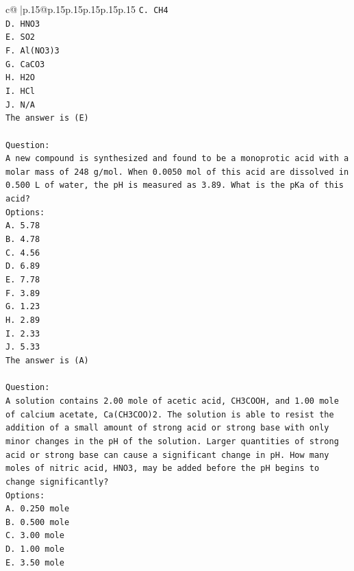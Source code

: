 \documentclass{article}
\begin{document}
{\begin{supertabular}{c@{$\;$}|p{.15\linewidth}@{}p{.15\linewidth}p{.15\linewidth}p{.15\linewidth}p{.15\linewidth}p{.15\linewidth}}
{{{\texttt{C. CH4} \\
\texttt{D. HNO3} \\
\texttt{E. SO2} \\
\texttt{F. Al(NO3)3} \\
\texttt{G. CaCO3} \\
\texttt{H. H2O} \\
\texttt{I. HCl} \\
\texttt{J. N/A} \\
\texttt{The answer is (E)} \\
\\ 
\texttt{Question:} \\
\texttt{A new compound is synthesized and found to be a monoprotic acid with a molar mass of 248 g/mol. When 0.0050 mol of this acid are dissolved in 0.500 L of water, the pH is measured as 3.89. What is the pKa of this acid?} \\
\texttt{Options:} \\
\texttt{A. 5.78} \\
\texttt{B. 4.78} \\
\texttt{C. 4.56} \\
\texttt{D. 6.89} \\
\texttt{E. 7.78} \\
\texttt{F. 3.89} \\
\texttt{G. 1.23} \\
\texttt{H. 2.89} \\
\texttt{I. 2.33} \\
\texttt{J. 5.33} \\
\texttt{The answer is (A)} \\
\\ 
\texttt{Question:} \\
\texttt{A solution contains 2.00 mole of acetic acid, CH3COOH, and 1.00 mole of calcium acetate, Ca(CH3COO)2. The solution is able to resist the addition of a small amount of strong acid or strong base with only minor changes in the pH of the solution. Larger quantities of strong acid or strong base can cause a significant change in pH. How many moles of nitric acid, HNO3, may be added before the pH begins to change significantly?} \\
\texttt{Options:} \\
\texttt{A. 0.250 mole} \\
\texttt{B. 0.500 mole} \\
\texttt{C. 3.00 mole} \\
\texttt{D. 1.00 mole} \\
\texttt{E. 3.50 mole} \\
}}}
\end{supertabular}}
\end{document}
